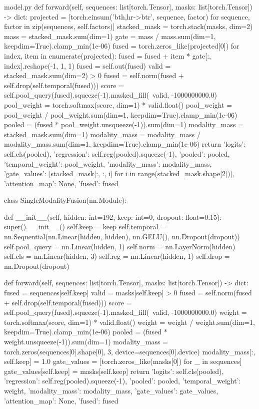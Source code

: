 \documentclass[bwprint]{gmcmthesis}
\begin{document}
\begin{appendices}
\begin{Python}{model.py}
    def forward(self, sequences: list[torch.Tensor], masks: list[torch.Tensor]) -> dict:
        projected = [torch.einsum('bth,hr->btr', sequence, factor) for sequence, factor in zip(sequences, self.factors)]
        stacked_mask = torch.stack(masks, dim=2)
        mass = stacked_mask.sum(dim=1)
        gate = mass / mass.sum(dim=1, keepdim=True).clamp_min(1e-06)
        fused = torch.zeros_like(projected[0])
        for index, item in enumerate(projected):
            fused = fused + item * gate[:, index].reshape(-1, 1, 1)
        fused = self.out(fused)
        valid = stacked_mask.sum(dim=2) > 0
        fused = self.norm(fused + self.drop(self.temporal(fused)))
        score = self.pool_query(fused).squeeze(-1).masked_fill(~valid, -1000000000.0)
        pool_weight = torch.softmax(score, dim=1) * valid.float()
        pool_weight = pool_weight / pool_weight.sum(dim=1, keepdim=True).clamp_min(1e-06)
        pooled = (fused * pool_weight.unsqueeze(-1)).sum(dim=1)
        modality_mass = stacked_mask.sum(dim=1)
        modality_mass = modality_mass / modality_mass.sum(dim=1, keepdim=True).clamp_min(1e-06)
        return {'logits': self.cls(pooled), 'regression': self.reg(pooled).squeeze(-1), 'pooled': pooled, 'temporal_weight': pool_weight, 'modality_mass': modality_mass, 'gate_values': [stacked_mask[:, :, i] for i in range(stacked_mask.shape[2])], 'attention_map': None, 'fused': fused}

class SingleModalityFusion(nn.Module):

    def __init__(self, hidden: int=192, keep: int=0, dropout: float=0.15):
        super().__init__()
        self.keep = keep
        self.temporal = nn.Sequential(nn.Linear(hidden, hidden), nn.GELU(), nn.Dropout(dropout))
        self.pool_query = nn.Linear(hidden, 1)
        self.norm = nn.LayerNorm(hidden)
        self.cls = nn.Linear(hidden, 3)
        self.reg = nn.Linear(hidden, 1)
        self.drop = nn.Dropout(dropout)

    def forward(self, sequences: list[torch.Tensor], masks: list[torch.Tensor]) -> dict:
        fused = sequences[self.keep]
        valid = masks[self.keep] > 0
        fused = self.norm(fused + self.drop(self.temporal(fused)))
        score = self.pool_query(fused).squeeze(-1).masked_fill(~valid, -1000000000.0)
        weight = torch.softmax(score, dim=1) * valid.float()
        weight = weight / weight.sum(dim=1, keepdim=True).clamp_min(1e-06)
        pooled = (fused * weight.unsqueeze(-1)).sum(dim=1)
        modality_mass = torch.zeros(sequences[0].shape[0], 3, device=sequences[0].device)
        modality_mass[:, self.keep] = 1.0
        gate_values = [torch.zeros_like(masks[0]) for _ in sequences]
        gate_values[self.keep] = masks[self.keep]
        return {'logits': self.cls(pooled), 'regression': self.reg(pooled).squeeze(-1), 'pooled': pooled, 'temporal_weight': weight, 'modality_mass': modality_mass, 'gate_values': gate_values, 'attention_map': None, 'fused': fused}


\end{Python}
\end{appendices}
\end{document}
